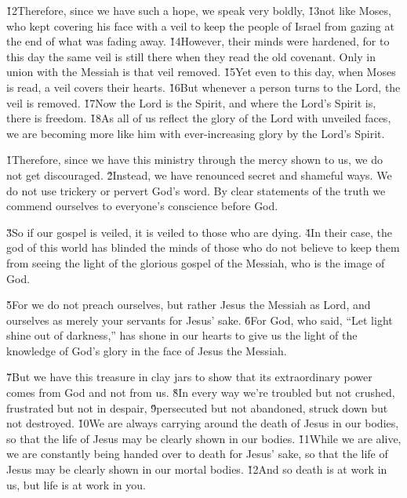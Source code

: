 \v{12}Therefore, since we have such a hope, we speak very boldly, \v{13}not like Moses, who kept covering his face with a veil to keep the people of Israel from gazing at the end of what was fading away. \v{14}However, their minds were hardened, for to this day the same veil is still there when they read the old covenant. Only in union with the Messiah is that veil removed. \v{15}Yet even to this day, when Moses is read, a veil covers their hearts. \v{16}But whenever a person turns to the Lord, the veil is removed. \v{17}Now the Lord is the Spirit, and where the Lord's Spirit is, there is freedom. \v{18}As all of us reflect the glory of the Lord with unveiled faces, we are becoming more like him with ever-increasing glory by the Lord's Spirit.

\v{1}Therefore, since we have this ministry through the mercy shown to us, we do not get discouraged. \v{2}Instead, we have renounced secret and shameful ways. We do not use trickery or pervert God's word. By clear statements of the truth we commend ourselves to everyone's conscience before God.

\v{3}So if our gospel is veiled, it is veiled to those who are dying. \v{4}In their case, the god of this world has blinded the minds of those who do not believe to keep them from seeing the light of the glorious gospel of the Messiah, who is the image of God.

\v{5}For we do not preach ourselves, but rather Jesus the Messiah as Lord, and ourselves as merely your servants for Jesus' sake. \v{6}For God, who said, ``Let light shine out of darkness,'' has shone in our hearts to give us the light of the knowledge of God's glory in the face of Jesus the Messiah.

\v{7}But we have this treasure in clay jars to show that its extraordinary power comes from God and not from us. \v{8}In every way we're troubled but not crushed, frustrated but not in despair, \v{9}persecuted but not abandoned, struck down but not destroyed. \v{10}We are always carrying around the death of Jesus in our bodies, so that the life of Jesus may be clearly shown in our bodies. \v{11}While we are alive, we are constantly being handed over to death for Jesus' sake, so that the life of Jesus may be clearly shown in our mortal bodies. \v{12}And so death is at work in us, but life is at work in you.

